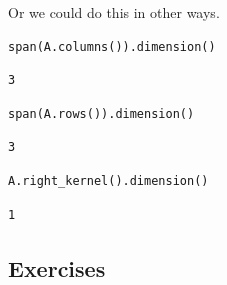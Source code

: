\documentclass[10pt,]{book}
\theoremstyle{plain}
\theoremstyle{definition}
\numberwithin{equation}{section}
\begin{document}
        Or we could do this in other ways.
\begin{lstlisting}[style=sageinput]
span(A.columns()).dimension()
\end{lstlisting}
\begin{lstlisting}[style=sageoutput]
3
\end{lstlisting}
\begin{lstlisting}[style=sageinput]
span(A.rows()).dimension()
\end{lstlisting}
\begin{lstlisting}[style=sageoutput]
3
\end{lstlisting}
\begin{lstlisting}[style=sageinput]
A.right_kernel().dimension()
\end{lstlisting}
\begin{lstlisting}[style=sageoutput]
1
\end{lstlisting}
\typeout{************************************************}
\typeout{************************************************}
\subsection[Exercises]{Exercises}\label{subsection-84}
\end{document}

